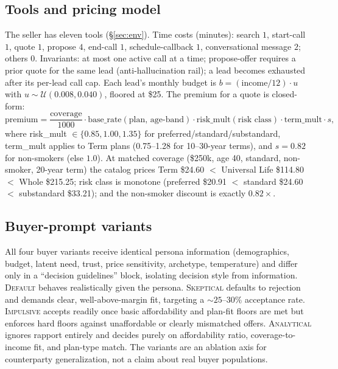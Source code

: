 \documentclass{article} %
\begin{document}
\subsection{Tools and pricing model}
\label{app:pricing}
The seller has eleven tools (\S\ref{sec:env}). Time costs (minutes): search $1$, start-call $1$, quote $1$, propose $4$,
end-call $1$, schedule-callback $1$, conversational message $2$; others $0$. Invariants: at most one active call at a time;
propose-offer requires a prior quote for the same lead (anti-hallucination rail); a lead becomes exhausted after its
per-lead call cap. Each lead's monthly budget is $b = (\text{income}/12)\cdot u$ with $u\sim\mathcal{U}(0.008, 0.040)$,
floored at \$25. The premium for a quote is closed-form:
\[
\text{premium} = \frac{\text{coverage}}{1000}\cdot \text{base\_rate}(\text{plan, age-band})\cdot
\text{risk\_mult}(\text{risk class})\cdot \text{term\_mult}\cdot s,
\]
where risk\_mult $\in\{0.85, 1.00, 1.35\}$ for preferred/standard/substandard, term\_mult applies to Term plans (0.75--1.28
for 10--30-year terms), and $s{=}0.82$ for non-smokers (else $1.0$). At matched coverage (\$250k, age 40, standard,
non-smoker, 20-year term) the catalog prices Term \$24.60 $<$ Universal Life \$114.80 $<$ Whole \$215.25; risk class is
monotone (preferred \$20.91 $<$ standard \$24.60 $<$ substandard \$33.21); and the non-smoker discount is exactly $0.82\times$.

\subsection{Buyer-prompt variants}
\label{app:buyervariants}
All four buyer variants receive identical persona information (demographics, budget, latent need, trust, price sensitivity,
archetype, temperature) and differ only in a ``decision guidelines'' block, isolating decision style from information.
\textsc{Default} behaves realistically given the persona. \textsc{Skeptical} defaults to rejection and demands clear,
well-above-margin fit, targeting a ${\sim}25\text{--}30\%$ acceptance rate. \textsc{Impulsive} accepts readily once basic
affordability and plan-fit floors are met but enforces hard floors against unaffordable or clearly mismatched offers.
\textsc{Analytical} ignores rapport entirely and decides purely on affordability ratio, coverage-to-income fit, and plan-type
match. The variants are an ablation axis for counterparty generalization, not a claim about real buyer populations.
\end{document}

